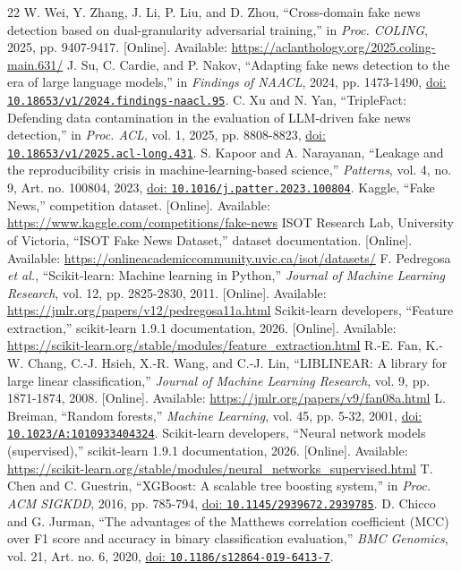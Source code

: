 \documentclass[conference]{IEEEtran}
\begin{document}
\begin{thebibliography}{22}
 W. Wei, Y. Zhang, J. Li, P. Liu, and D. Zhou, ``Cross-domain fake news detection based on dual-granularity adversarial training,'' in \emph{Proc. COLING}, 2025, pp. 9407-9417. [Online]. Available: \url{https://aclanthology.org/2025.coling-main.631/}
 J. Su, C. Cardie, and P. Nakov, ``Adapting fake news detection to the era of large language models,'' in \emph{Findings of NAACL}, 2024, pp. 1473-1490, \href{https://doi.org/10.18653/v1/2024.findings-naacl.95}{doi: \nolinkurl{10.18653/v1/2024.findings-naacl.95}}.
 C. Xu and N. Yan, ``TripleFact: Defending data contamination in the evaluation of LLM-driven fake news detection,'' in \emph{Proc. ACL}, vol. 1, 2025, pp. 8808-8823, \href{https://doi.org/10.18653/v1/2025.acl-long.431}{doi: \nolinkurl{10.18653/v1/2025.acl-long.431}}.
 S. Kapoor and A. Narayanan, ``Leakage and the reproducibility crisis in machine-learning-based science,'' \emph{Patterns}, vol. 4, no. 9, Art. no. 100804, 2023, \href{https://doi.org/10.1016/j.patter.2023.100804}{doi: \nolinkurl{10.1016/j.patter.2023.100804}}.
 Kaggle, ``Fake News,'' competition dataset. [Online]. Available: \url{https://www.kaggle.com/competitions/fake-news}
 ISOT Research Lab, University of Victoria, ``ISOT Fake News Dataset,'' dataset documentation. [Online]. Available: \url{https://onlineacademiccommunity.uvic.ca/isot/datasets/}
 F. Pedregosa \emph{et al.}, ``Scikit-learn: Machine learning in Python,'' \emph{Journal of Machine Learning Research}, vol. 12, pp. 2825-2830, 2011. [Online]. Available: \url{https://jmlr.org/papers/v12/pedregosa11a.html}
 Scikit-learn developers, ``Feature extraction,'' scikit-learn 1.9.1 documentation, 2026. [Online]. Available: \url{https://scikit-learn.org/stable/modules/feature_extraction.html}
 R.-E. Fan, K.-W. Chang, C.-J. Hsieh, X.-R. Wang, and C.-J. Lin, ``LIBLINEAR: A library for large linear classification,'' \emph{Journal of Machine Learning Research}, vol. 9, pp. 1871-1874, 2008. [Online]. Available: \url{https://jmlr.org/papers/v9/fan08a.html}
 L. Breiman, ``Random forests,'' \emph{Machine Learning}, vol. 45, pp. 5-32, 2001, \href{https://doi.org/10.1023/A:1010933404324}{doi: \nolinkurl{10.1023/A:1010933404324}}.
 Scikit-learn developers, ``Neural network models (supervised),'' scikit-learn 1.9.1 documentation, 2026. [Online]. Available: \url{https://scikit-learn.org/stable/modules/neural_networks_supervised.html}
 T. Chen and C. Guestrin, ``XGBoost: A scalable tree boosting system,'' in \emph{Proc. ACM SIGKDD}, 2016, pp. 785-794, \href{https://doi.org/10.1145/2939672.2939785}{doi: \nolinkurl{10.1145/2939672.2939785}}.
 D. Chicco and G. Jurman, ``The advantages of the Matthews correlation coefficient (MCC) over F1 score and accuracy in binary classification evaluation,'' \emph{BMC Genomics}, vol. 21, Art. no. 6, 2020, \href{https://doi.org/10.1186/s12864-019-6413-7}{doi: \nolinkurl{10.1186/s12864-019-6413-7}}.
\end{thebibliography}
\end{document}
